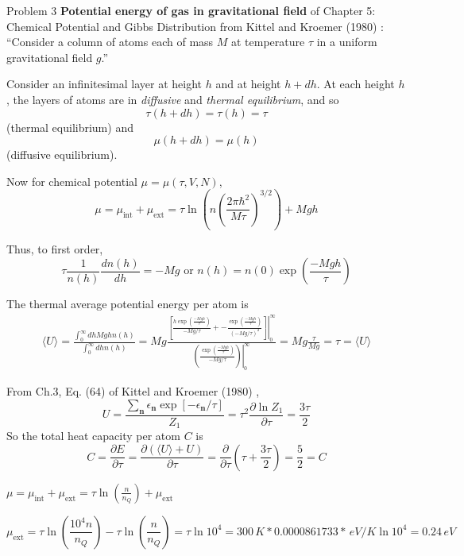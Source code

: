 \documentclass[twoside]{amsart}
\theoremstyle{plain}
\theoremstyle{definition}
\newcommand{\solutionhead}[1]
  {
   \noindent{\small\bf Solution #1.}
   }
\begin{document}
Problem 3 \textbf{Potential energy of gas in gravitational field} of Chapter 5: Chemical Potential and Gibbs Distribution from Kittel and Kroemer (1980) \cite{CKittelHKroemer1980}: ``Consider a column of atoms each of mass $M$ at temperature $\tau$ in a uniform gravitational field $g$.''

Consider an infinitesimal layer at height $h$ and at height $h+dh$.  At each height $h$, the layers of atoms are in \emph{diffusive} and \emph{thermal equilibrium}, and so
\[
\tau(h+dh) = \tau(h) = \tau
\]
(thermal equilibrium) and 
\[
\mu(h+dh) = \mu(h)
\]
(diffusive equilibrium).  

Now for chemical potential $\mu = \mu(\tau,V,N)$,
\[
\mu = \mu_{\text{int}} + \mu_{\text{ext}} = \tau \ln{ \left( n \left( \frac{ 2\pi \hbar^2 }{M\tau} \right)^{3/2} \right) } + Mgh
\]

Thus, to first order,
\[
\tau \frac{1}{n(h) } \frac{ dn(h) }{dh} = -Mg \text{ or } n(h) = n(0) \exp{ \left( \frac{-Mgh}{\tau} \right) }
\]

The thermal average potential energy per atom is 
\[
\begin{gathered}
  \langle U \rangle = \frac{ \int_0^{\infty} dh Mgh n(h) }{ \int_0^{\infty} dh n(h) } = Mg \frac{ \left. \left[ \frac{ h \exp{ \left( \frac{-Mgh}{\tau} \right) } }{ -Mg/\tau } + - \frac{ \exp{ \left( \frac{-Mgh}{\tau} \right) } }{ (-Mg/\tau)^2 } \right] \right|_0^{\infty} }{ \left. \left( \frac{ \exp{ \left( \frac{-Mgh}{\tau } \right) } }{ -Mg/\tau} \right) \right|_0^{\infty} } = Mg \frac{\tau}{Mg} = \boxed{ \tau = \langle U \rangle }
\end{gathered}
\]

From Ch.3, Eq. (64) of Kittel and Kroemer (1980) \cite{CKittelHKroemer1980}, 
\[
U = \frac{ \sum_{\mathbf{n}} \epsilon_{\mathbf{n}} \exp{ \left[ -\epsilon_{\mathbf{n}} /\tau \right] } }{Z_1} = \tau^2 \frac{ \partial \ln{Z_1}}{\partial \tau } = \frac{3\tau}{2}
\]
So the total heat capacity per atom $C$ is 
\[
C = \frac{ \partial E}{ \partial \tau} = \frac{ \partial ( \langle U \rangle + U ) }{ \partial \tau } = \frac{ \partial }{ \partial \tau} ( \tau + \frac{3\tau}{2} ) = \boxed{ \frac{5}{2}  = C}
\]

\solutionhead{4} $\mu = \mu_{\text{int}} + \mu_{\text{ext}} = \tau \ln{ \left( \frac{n}{n_Q} \right) } + \mu_{\text{ext}}$

\[
\mu_{\text{ext}} = \tau \ln{ \left( \frac{10^4 n }{n_Q} \right) } - \tau \ln{ \left( \frac{n}{n_Q} \right) } = \tau \ln{ 10^4} = 300 \, K * 0.0000861733 * \, eV/K \ln{ 10^4} = 0.24 \, eV
\]
\end{document}
